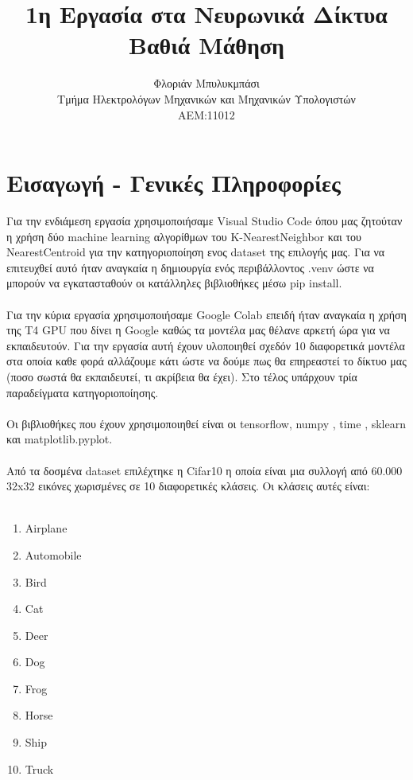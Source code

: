 \documentclass[11pt, letterpaper]{article}
\begin{document}
\begin{titlepage}
\title{\textbf{\Huge 1η Εργασία στα Νευρωνικά Δίκτυα Βαθιά Μάθηση} \vspace{7 cm}}

\author{\LARGE Φλοριάν Μπυλυκμπάσι \\ \LARGE Τμήμα Ηλεκτρολόγων Μηχανικών και Μηχανικών Υπολογιστών \\ \LARGE ΑΕΜ:11012 \vspace{4 cm}}
\maketitle
\thispagestyle{empty}
\end{titlepage}


\section*{Εισαγωγή - Γενικές Πληροφορίες}
Για την ενδιάμεση εργασία χρησιμοποιήσαμε Visual Studio Code όπου μας ζητούταν η χρήση δύο machine learning αλγορίθμων 
του K-NearestNeighbor και του NearestCentroid για την κατηγοριοποίηση ενος dataset της επιλογής μας. Για να επιτευχθεί αυτό ήταν αναγκαία
η δημιουργία ενός περιβάλλοντος .venv ώστε να μπορούν να εγκατασταθούν οι κατάλληλες βιβλιοθήκες μέσω pip install. \\ \\
Για την κύρια εργασία χρησιμοποιήσαμε Google Colab επειδή ήταν αναγκαία η χρήση της T4 GPU που δίνει η Google καθώς τα μοντέλα μας 
θέλανε αρκετή ώρα για να εκπαιδευτούν. Για την εργασία αυτή έχουν υλοποιηθεί σχεδόν 10 διαφορετικά μοντέλα στα οποία καθε φορά αλλάζουμε κάτι ώστε 
να δούμε πως θα επηρεαστεί το δίκτυο μας (ποσο σωστά θα εκπαιδευτεί, τι ακρίβεια θα έχει). Στο τέλος υπάρχουν τρία παραδείγματα κατηγοριοποίησης.\\ \\
Οι βιβλιοθήκες που έχουν χρησιμοποιηθεί  είναι οι tensorflow, numpy , time , sklearn και matplotlib.pyplot. \\ \\
Από τα δοσμένα dataset επιλέχτηκε η Cifar10 η οποία είναι μια συλλογή από 60.000 32x32 εικόνες
χωρισμένες σε 10 διαφορετικές κλάσεις. Οι κλάσεις αυτές είναι: \\ \\
\begin{enumerate}
    \item Airplane
    \item Automobile
    \item Bird
    \item Cat
    \item Deer
    \item Dog
    \item Frog
    \item Horse
    \item Ship
    \item Truck \\ \\
\end{enumerate} 
\end{document}
